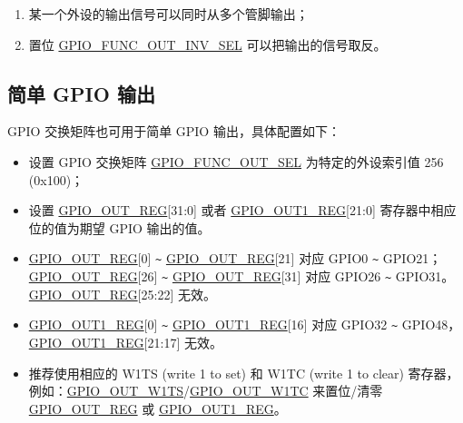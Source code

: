 \documentclass[main\_\_CN.tex]{subfiles}
\begin{document}
\begin{tiplisting}
\vspace{-2em}
\begin{enumerate}
\item \label{output-note-1} 某一个外设的输出信号可以同时从多个管脚输出；

\item  \label{output-note-3} 置位 \hyperref[fielddesc:GPIOFUNCNOUTINVSEL]{GPIO\_FUNC\_OUT\_INV\_SEL} 可以把输出的信号取反。
\end{enumerate}
\end{tiplisting}

\subsection{简单 GPIO 输出}

GPIO 交换矩阵也可用于简单 GPIO 输出，具体配置如下：
\begin{itemize}
    \item 设置 GPIO 交换矩阵 \hyperref[fielddesc:GPIOFUNCNOUTSEL]{GPIO\_FUNC\_OUT\_SEL} 为特定的外设索引值 256  (0x{}100)；
    \item 设置 \hyperref[regdesc:GPIOOUTREG]{GPIO\_OUT\_REG}[31:0] 或者 \hyperref[regdesc:GPIOOUT1REG]{GPIO\_OUT1\_REG}[21:0] 寄存器中相应位的值为期望 GPIO 输出的值。
\end{itemize}

\begin{tiplisting}
\vspace{-2em}
\begin{itemize}
\item \hyperref[regdesc:GPIOOUTREG]{GPIO\_OUT\_REG}[0] \verb+~+ \hyperref[regdesc:GPIOOUTREG]{GPIO\_OUT\_REG}[21] 对应 GPIO0 \verb+~+ GPIO21；\hyperref[regdesc:GPIOOUTREG]{GPIO\_OUT\_REG}[26] \verb+~+ \hyperref[regdesc:GPIOOUTREG]{GPIO\_OUT\_REG}[31] 对应 GPIO26 \verb+~+ GPIO31。\hyperref[regdesc:GPIOOUTREG]{GPIO\_OUT\_REG}[25:22] 无效。
\item \hyperref[regdesc:GPIOOUT1REG]{GPIO\_OUT1\_REG}[0] \verb+~+ \hyperref[regdesc:GPIOOUT1REG]{GPIO\_OUT1\_REG}[16] 对应 GPIO32 \verb+~+ GPIO48，\hyperref[regdesc:GPIOOUT1REG]{GPIO\_OUT1\_REG}[21:17] 无效。
\item 推荐使用相应的 W1TS (write 1 to set) 和 W1TC (write 1 to clear) 寄存器，例如：\hyperref[fielddesc:GPIOOUTW1TS]{GPIO\_OUT\_W1TS}/\hyperref[fielddesc:GPIOOUTW1TC]{GPIO\_OUT\_W1TC} 来置位/清零 \hyperref[regdesc:GPIOOUTREG]{GPIO\_OUT\_REG} 或 \hyperref[regdesc:GPIOOUT1REG]{GPIO\_OUT1\_REG}。
\end{itemize}
\end{tiplisting}
\end{document}
